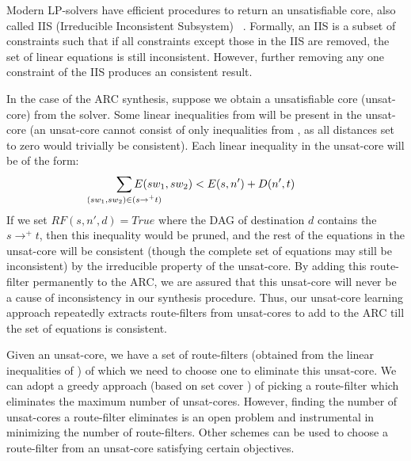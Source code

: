 Modern LP-solvers have efficient procedures to return an
unsatisfiable core, also called IIS (Irreducible Inconsistent Subsystem)
~\cite{chinneck2007feasibility}. Formally, an IIS is a subset of constraints such that
if all constraints except those in the IIS are removed, the set of
linear equations is still inconsistent. However, further removing 
any one constraint of the IIS produces an consistent result. 

In the case of the ARC synthesis, suppose we obtain
a unsatisfiable core (unsat-core) from the solver. 
Some linear inequalities 
from  will be present in the unsat-core 
(an unsat-core cannot consist of only 
inequalities from , as all distances set to zero
would trivially be consistent). Each linear inequality
in the unsat-core will be of the form:
\begin{eqnarray}
	\sum_{\mathclap{\substack{(sw_1, sw_2) \in (s \rightarrow^+ t)}}} 
		E(sw_1, sw_2) < E(s, n') + D(n', t)  \nonumber
\end{eqnarray}
If we set $RF(s,n',d) = True$ where the DAG of destination $d$
contains the $s \rightarrow^+ t$, then this inequality would be pruned,
and the rest of the equations in the unsat-core will be consistent (though
the complete set of equations may still be inconsistent) by the 
irreducible property of the unsat-core. By adding this route-filter
permanently to the ARC, we are assured that this unsat-core will 
never be a cause of inconsistency in our synthesis procedure. 
Thus, our unsat-core learning approach 
repeatedly extracts route-filters 
from unsat-cores to add to the ARC
till the set of equations is consistent. 


Given an unsat-core, we have a set of route-filters (obtained
from the linear inequalities of ) of which we 
need to choose one to eliminate this unsat-core.
We can 
adopt a greedy approach (based on set cover \cite{setcover}) 
of picking a route-filter which 
eliminates the maximum number of unsat-cores. However, 
finding the number of unsat-cores a route-filter eliminates
is an open problem and instrumental in minimizing the number 
of route-filters. Other schemes can be used to choose 
a route-filter from an unsat-core satisfying certain
objectives. 

